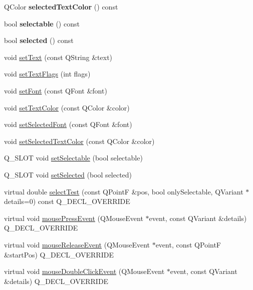 \begin{DoxyCompactItemize}
\mbox{\label{classQCPTextElement_a98616fa5c33f1eaee0428191ece39686}} 
Q\+Color {\bfseries selected\+Text\+Color} () const
\item 
\mbox{\label{classQCPTextElement_a96e2a712fca40324a8489f75833b4096}} 
bool {\bfseries selectable} () const
\item 
\mbox{\label{classQCPTextElement_a135d1ad0aa97a245b4247c3292ff551c}} 
bool {\bfseries selected} () const
\item 
void \hyperlink{classQCPTextElement_ac44b81e69e719b879eb2feecb33557e2}{set\+Text} (const Q\+String \&text)
\item 
void \hyperlink{classQCPTextElement_ab908f437f552020888a3ad8cf8242605}{set\+Text\+Flags} (int flags)
\item 
void \hyperlink{classQCPTextElement_a09b3241769528fa87cb4bf35c97defad}{set\+Font} (const Q\+Font \&font)
\item 
void \hyperlink{classQCPTextElement_a4f3b8361c3ffb3f84346954929ce93ba}{set\+Text\+Color} (const Q\+Color \&color)
\item 
void \hyperlink{classQCPTextElement_a0a2397a3c4ede519e16ab3e991904065}{set\+Selected\+Font} (const Q\+Font \&font)
\item 
void \hyperlink{classQCPTextElement_abaec200cae70a0eade53583defc0476d}{set\+Selected\+Text\+Color} (const Q\+Color \&color)
\item 
Q\+\_\+\+S\+L\+OT void \hyperlink{classQCPTextElement_a3c5f9b1897a036b16495ed3fb8371c55}{set\+Selectable} (bool selectable)
\item 
Q\+\_\+\+S\+L\+OT void \hyperlink{classQCPTextElement_aba5521f9fb22a5f3d2f09ab37d4a1751}{set\+Selected} (bool selected)
\item 
virtual double \hyperlink{classQCPTextElement_a1e721bc2994a127ef5a8f0a514a5dbac}{select\+Test} (const Q\+PointF \&pos, bool only\+Selectable, Q\+Variant $\ast$details=0) const Q\+\_\+\+D\+E\+C\+L\+\_\+\+O\+V\+E\+R\+R\+I\+DE
\item 
virtual void \hyperlink{classQCPTextElement_ad7b2c98355e3d2f912574b74fcee0574}{mouse\+Press\+Event} (Q\+Mouse\+Event $\ast$event, const Q\+Variant \&details) Q\+\_\+\+D\+E\+C\+L\+\_\+\+O\+V\+E\+R\+R\+I\+DE
\item 
virtual void \hyperlink{classQCPTextElement_acfcbaf9b1da18745e72726aafb39c855}{mouse\+Release\+Event} (Q\+Mouse\+Event $\ast$event, const Q\+PointF \&start\+Pos) Q\+\_\+\+D\+E\+C\+L\+\_\+\+O\+V\+E\+R\+R\+I\+DE
\item 
virtual void \hyperlink{classQCPTextElement_a2272ff775ab385f612e9fd39773de7c0}{mouse\+Double\+Click\+Event} (Q\+Mouse\+Event $\ast$event, const Q\+Variant \&details) Q\+\_\+\+D\+E\+C\+L\+\_\+\+O\+V\+E\+R\+R\+I\+DE
\end{DoxyCompactItemize}
